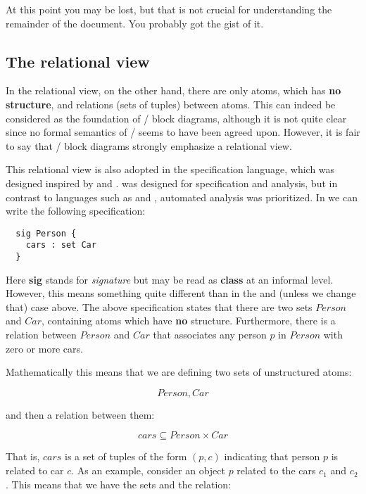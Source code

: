 \documentclass{llncs}
\begin{document}
\noindent At this point you may be lost, but that is not crucial
for understanding the remainder of the document. You probably got the gist of it.

\subsection{The relational view}

In the relational view, on the other hand, there are only atoms, which 
has {\bf no structure}, and relations (sets of tuples) between 
atoms. This can indeed be considered as the foundation of \uml/\sysml{} block diagrams, although it is not quite clear since no formal semantics of \uml/\sysml{} seems to have been agreed upon. However, it is fair to say that \uml/\sysml{} block diagrams strongly
emphasize a relational view. 

This relational view is also adopted in the \alloy{} specification language, which was designed inspired by \uml{} and \zlang{}. \alloy{} was designed for
specification and analysis, but in contrast to languages such as \vdm{} and \zlang{}, automated analysis was prioritized. In \alloy{} we can write 
the following specification:

\salloy
\begin{lstlisting}
  sig Person {
    cars : set Car
  }
\end{lstlisting}

\noindent Here {\bf sig} stands for {\em signature} but may be read as 
{\bf class} at an informal level. However, this means something quite 
different than in the \scala{} and \klang{} (unless we change that) 
case above. The above specification states that there are two sets 
$Person$ and $Car$, containing atoms which have {\bf no} structure. Furthermore, there is a relation between $Person$ and $Car$
that associates any person $p$ in $Person$ with zero or more cars.

Mathematically this means that we are defining two sets of unstructured 
atoms:

\[
Person, Car
\]

\noindent
and then a relation between them:

\[
cars \subseteq Person \times Car
\]

\noindent  
That is, $cars$ is a set of tuples of the form $(p,c)$ indicating that
person $p$ is related to car $c$.
As an example, consider an object $p$ related to the cars 
$c_1$ and $c_2$. 
This means that we have the sets and the relation:
\end{document}
